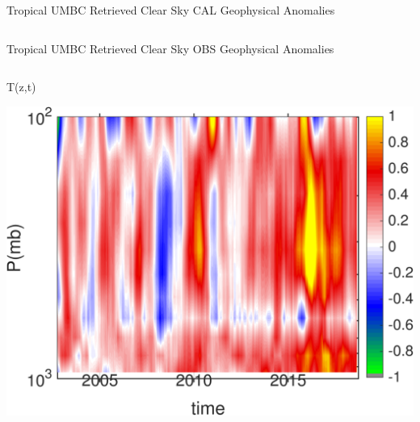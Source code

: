 \documentclass[10pt,t]{beamer}
\begin{document}
\begin{frame}{Tropical UMBC Retrieved Clear Sky CAL Geophysical Anomalies}
\begin{columns}
\begin{column}{0.45\columnwidth}

\end{column}
\end{columns}
\end{frame}


\begin{frame}{Tropical UMBC Retrieved Clear Sky OBS Geophysical Anomalies}
\vspace{-0.35in}

\begin{columns}
\begin{column}{0.45\columnwidth}
\begin{block}{\footnotesize T(z,t)}
\vspace{-0.1in}
\begin{center}
\includegraphics[width=\linewidth]{Figs/ClearAnom/umbc_clr_retr_obs_ptemp_anom_200209_201808.png}
\end{center}
\end{block}
\end{column}


\end{columns}
\end{frame}
\end{document}

